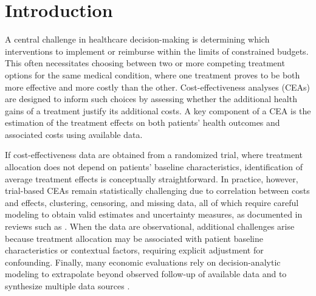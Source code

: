 \documentclass[aoas,preprint]{imsart}
\theoremstyle{plain}
\theoremstyle{definition}
\theoremstyle{remark}
\theoremstyle{remark}
\begin{document}
\begin{frontmatter}
\begin{aug}
\end{aug}
\begin{abstract}
Healthcare decision-making often requires selecting among multiple treatment options under budget constraints, particularly when one option is more effective but also more costly. Cost-effectiveness analysis (CEA) provides a framework for evaluating whether the health benefits of a treatment justify its additional costs. A key component of a CEA is the estimation of treatment effects on both health outcomes and costs, which becomes challenging when using observational data, due to potential confounding. While advanced causal inference methods exist for use in such circumstances, their adoption in CEAs remains limited, with many studies relying on overly simplistic methods such as linear regression or propensity score matching. 
In this paper, we address this gap by introducing cost-effectiveness researchers to modern nonparametric regression models, with a particular focus on Bayesian Additive Regression Trees (BART). We provide guidance on how to implement BART in CEAs, including code examples, and discuss its advantages in producing more robust and credible estimates from observational data. 
\end{abstract}

\end{frontmatter}

\section{Introduction}

A central challenge in healthcare decision-making is determining which interventions to implement or reimburse within the limits of constrained budgets. This often necessitates choosing between two or more competing treatment options for the same medical condition, where one treatment proves to be both more effective and more costly than the other. Cost-effectiveness analyses (CEAs) are designed to inform such choices by assessing whether the additional health gains of a treatment justify its additional costs.  A key component of a CEA is the estimation of the treatment effects on both patients’ health outcomes and associated costs using available data.

If cost-effectiveness data are obtained from a randomized trial, where treatment allocation does not depend on patients’ baseline characteristics, identification of average treatment effects is conceptually straightforward. In practice, however, trial-based CEAs remain statistically challenging due to correlation between costs and effects, clustering, censoring, and missing data, all of which require careful modeling to obtain valid estimates and uncertainty measures, as documented in reviews such as \citet{el2022scoping}. When the data are observational, additional challenges arise because treatment allocation may be associated with patient baseline characteristics or contextual factors, requiring explicit adjustment for confounding. Finally, many economic evaluations rely on decision-analytic modeling to extrapolate beyond observed follow-up of available data and to synthesize multiple data sources \citep{Sculpher2006}.
\end{document}
